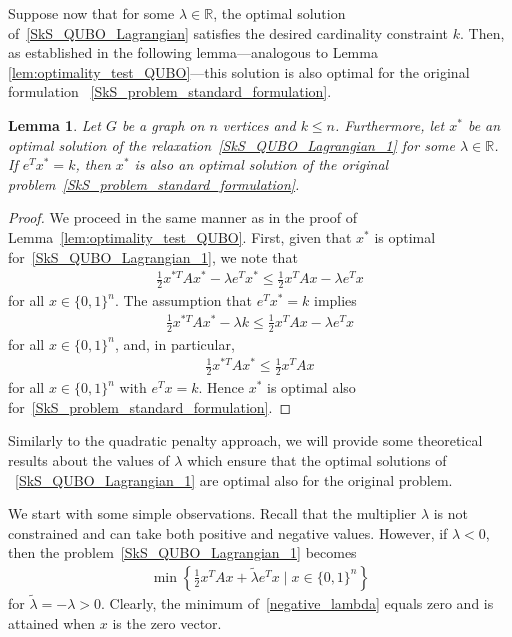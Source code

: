\documentclass{article}
\newtheorem{lem}[thm]{Lemma}
\begin{document}
Suppose now that for some $\lambda \in  \mathbb{R}$, the optimal solution of~\eqref{SkS_QUBO_Lagrangian} satisfies the desired cardinality constraint $k$. Then, as established in the following lemma—analogous to Lemma \ref{lem:optimality_test_QUBO}—this solution is also optimal for the original formulation ~\eqref{SkS_problem_standard_formulation}.\\

\begin{lem}\label{lem:optimality_test_LR}
Let $G$ be a graph on $n$ vertices and $k\le n$. Furthermore, let $x^*$ be an optimal solution of the relaxation~\eqref{SkS_QUBO_Lagrangian_1} for some $\lambda \in \mathbb{R}$. If $e^T x^* = k$, then $x^*$ is also an optimal solution of the original problem~\eqref{SkS_problem_standard_formulation}.
\end{lem}

\begin{proof}
We proceed in the same manner as in the proof of Lemma~\ref{lem:optimality_test_QUBO}. First, given that $x^*$ is optimal for~\eqref{SkS_QUBO_Lagrangian_1}, we note that
\begin{align*}
\frac{1}{2}x^{*T} A x^* - \lambda e^T x^* \leq \frac{1}{2} x^T A x - \lambda  e^T x
\end{align*}
for all $x \in \{0,1\}^n$. The assumption that  $e^T x^* = k$ implies 
\begin{align*}
\frac{1}{2} x^{*T} A x^* -\lambda k\leq \frac{1}{2} x^T A x - \lambda  e^T x
\end{align*}
for all $x \in \{0,1\}^n$, and, in particular,
\begin{align*}
\frac{1}{2}x^{*T} A x^* \leq \frac{1}{2} x^T A x 
\end{align*}
for all $x \in \{0,1\}^n$ with $e^T x = k$. Hence $x^*$ is optimal also for~\eqref{SkS_problem_standard_formulation}.
\end{proof}

Similarly to the quadratic penalty approach, we will provide some theoretical results about the values of $\lambda$  which ensure that the optimal solutions of ~\eqref{SkS_QUBO_Lagrangian_1} are optimal also for the original problem.

We start with some simple observations. Recall that the multiplier $\lambda$ is not constrained and can take both positive and negative values. However, if $\lambda < 0$, then the problem~\eqref{SkS_QUBO_Lagrangian_1} becomes
\begin{align}
\min \left\{\frac{1}{2}x^TAx + \tilde{\lambda} e^Tx \mid x \in \{0, 1\}^n \right\}\label{negative_lambda}
\end{align}
for $\tilde{\lambda} = - \lambda > 0$. Clearly, the minimum of~\eqref{negative_lambda} equals zero and is attained when $x$ is the zero vector.
\end{document}
